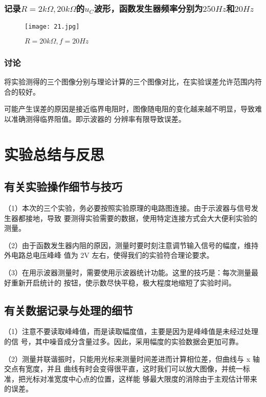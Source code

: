 \documentclass[11pt,a4paper]{article}
\begin{document}
    \subsubsection{记录$R=2k\Omega,20k\Omega$的$u_C$波形，函数发生器频率分别为$250Hz$和$20Hz$}
    \begin{figure}[H]
        \centering
        \caption*{$R=20k\Omega,f=20Hz$}
        \texttt{[image: 21.jpg]}
    \end{figure}


    \subsubsection{讨论}
    将实验测得的三个图像分别与理论计算的三个图像对比，在实验误差允许范围内符合的较好。\par
    可能产生误差的原因是接近临界电阻时，图像随电阻的变化越来越不明显，导致难以准确测得临界阻值。即示波器的
    分辨率有限导致误差。
    
\section{实验总结与反思}
    \subsection{有关实验操作细节与技巧}
    （1）本次的三个实验，务必要按照实验原理的电路图连接。由于示波器与信号发生器都接地，导致
    要测得实验需要的数据，使用特定连接方式会大大便利实验的测量。\par
    （2）由于函数发生器内阻的原因，测量时要时刻注意调节输入信号的幅度，维持外电路总电压峰峰
    值为 2V 左右，使得我们的实验符合理论要求。\par
    （3）在用示波器测量时，需要使用示波器统计功能。这里的技巧是：每次测量最好重新开启统计的
    按钮，使示数尽快平稳，极大程度地缩短了实验时间。\par

    \subsection{有关数据记录与处理的细节}
    （1）注意不要读取峰峰值，而是读取幅度值，主要是因为是峰峰值是未经过处理的信
    号，其中噪音成分含量过多。因此，采用幅度的实验数据会更加可靠。\par
    （2）测量并联谐振时，只能用光标来测量时间差进而计算相位差，但曲线与 x 轴交点有宽度，并且
    曲线有时会变得很平直，这时我们可以放大图像，并统一标准，把光标对准宽度中心点的位置，这样能
    够最大限度的消除由于主观估计带来的误差。
\end{document}

